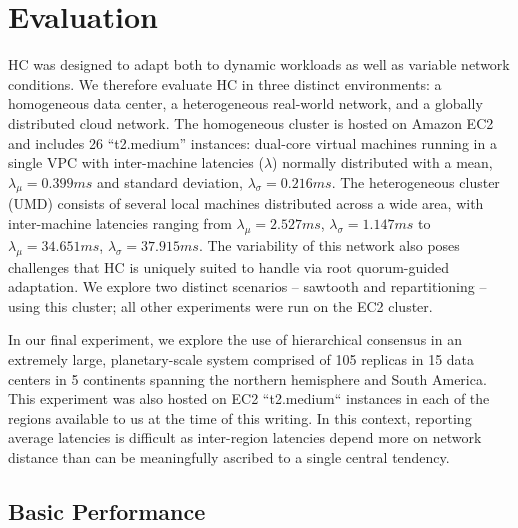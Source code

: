 \documentclass[11pt,conference]{IEEEtran}
\begin{document}
\section{Evaluation}

HC was designed to adapt both to dynamic workloads as well as variable network 
conditions.
We therefore evaluate HC in three distinct environments: a homogeneous data center, a 
heterogeneous real-world network, and a globally distributed cloud network.
The homogeneous cluster is hosted on Amazon EC2 and includes 26 ``t2.medium'' instances: 
dual-core virtual machines running in a single VPC with inter-machine latencies 
($\lambda$) normally distributed with a mean, $\lambda_{\mu}=0.399ms$ and standard 
deviation, $\lambda_{\sigma}=0.216ms$.
The heterogeneous cluster (UMD) consists of several local machines distributed across a 
wide area, with inter-machine latencies ranging from
$\lambda_{\mu}=2.527ms$,
$\lambda_{\sigma}=1.147ms$ to $\lambda_{\mu}=34.651ms$,
$\lambda_{\sigma}=37.915ms$.
The variability of this network also poses challenges that HC is uniquely suited to 
handle via root quorum-guided adaptation.
We explore two distinct scenarios -- sawtooth and repartitioning -- using this cluster; 
all other experiments were run on the EC2 cluster.

In our final experiment, we explore the use of hierarchical consensus in an extremely 
large, planetary-scale system comprised of 105 replicas in 15 data centers in 5 
continents spanning the northern hemisphere and South America. This experiment was also 
hosted on EC2 ``t2.medium`` instances in each of the regions available to us at the time 
of this writing. In this context, reporting average latencies is difficult as 
inter-region latencies depend more on network distance than can be meaningfully 
ascribed to a single central tendency.

\subsection{Basic Performance}
\end{document}
